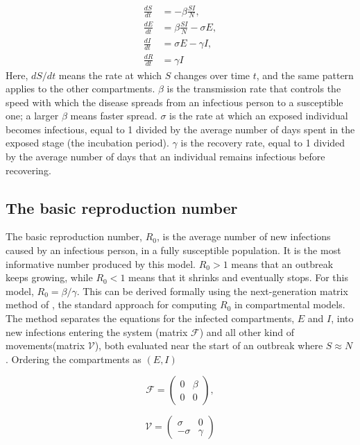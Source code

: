 \documentclass[journal]{IEEEtran}
\begin{document}
\begin{align}
\frac{dS}{dt} &= -\beta \frac{S I}{N},\\
\frac{dE}{dt} &= \beta \frac{S I}{N} - \sigma E, \\
\frac{dI}{dt} &= \sigma E - \gamma I,\\
\frac{dR}{dt} &= \gamma I
\end{align}
Here, $dS/dt$ means the rate at which $S$ changes over time $t$, and the same pattern applies to the other compartments. $\beta$ is the transmission rate that controls the speed with which the disease spreads from an infectious person to a susceptible one; a larger $\beta$ means faster spread. $\sigma$ is the rate at which an exposed individual becomes infectious, equal to 1 divided by the average number of days spent in the exposed stage (the incubation period). $\gamma$ is the recovery rate, equal to 1 divided by the average number of days that an individual remains infectious before recovering.

\subsection{The basic reproduction number}

The basic reproduction number, $R_0$, is the average number of new infections caused by an infectious person, in a fully susceptible population. It is the most informative number produced by this model. $R_0 > 1$ means that an outbreak keeps growing, while $R_0 < 1$ means that it shrinks and eventually stops. For this model, $R_0 = \beta/\gamma$. This can be derived formally using the next-generation matrix method of \cite{vandendriessche2002}, the standard approach for computing $R_0$ in compartmental models. The method separates the equations for the infected compartments, $E$ and $I$, into new infections entering the system (matrix $\mathcal{F}$) and all other kind of movements(matrix $\mathcal{V}$), both evaluated near the start of an outbreak where $S \approx N$. Ordering the compartments as
$(E,I)$

\begin{equation}
\mathcal{F} = \begin{pmatrix} 0 & \beta \\ 0 & 0 \end{pmatrix}, 
\end{equation}


\begin{equation}
\mathcal{V} = \begin{pmatrix} \sigma & 0 \\ -\sigma & \gamma \end{pmatrix} 
\end{equation}
\end{document}
